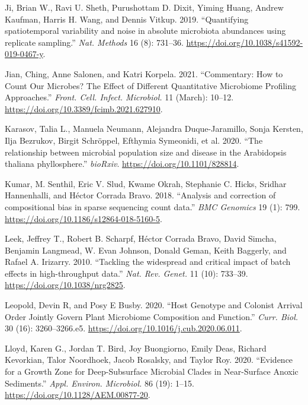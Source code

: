 \documentclass[
]{article}
\newlength{\cslhangindent}
\newlength{\cslentryspacingunit} %
\newenvironment{CSLReferences}[2] %
 {%
  \setlength{\parindent}{0pt}
  \ifodd #1
  \let\oldpar\par
  \def\par{\hangindent=\cslhangindent\oldpar}
  \fi
  \setlength{\parskip}{#2\cslentryspacingunit}
 }%
 {}
\begin{document}
\begin{CSLReferences}{1}{0}
\leavevmode{}%
Ji, Brian W., Ravi U. Sheth, Purushottam D. Dixit, Yiming Huang, Andrew Kaufman, Harris H. Wang, and Dennis Vitkup. 2019. {``{Quantifying spatiotemporal variability and noise in absolute microbiota abundances using replicate sampling}.''} \emph{Nat. Methods} 16 (8): 731--36. \url{https://doi.org/10.1038/s41592-019-0467-y}.

\leavevmode{}%
Jian, Ching, Anne Salonen, and Katri Korpela. 2021. {``{Commentary: How to Count Our Microbes? The Effect of Different Quantitative Microbiome Profiling Approaches}.''} \emph{Front. Cell. Infect. Microbiol.} 11 (March): 10--12. \url{https://doi.org/10.3389/fcimb.2021.627910}.

\leavevmode{}%
Karasov, Talia L., Manuela Neumann, Alejandra Duque-Jaramillo, Sonja Kersten, Ilja Bezrukov, Birgit Schröppel, Efthymia Symeonidi, et al. 2020. {``{The relationship between microbial population size and disease in the Arabidopsis thaliana phyllosphere}.''} \emph{bioRxiv}. \url{https://doi.org/10.1101/828814}.

\leavevmode{}%
Kumar, M. Senthil, Eric V. Slud, Kwame Okrah, Stephanie C. Hicks, Sridhar Hannenhalli, and Héctor Corrada Bravo. 2018. {``{Analysis and correction of compositional bias in sparse sequencing count data}.''} \emph{BMC Genomics} 19 (1): 799. \url{https://doi.org/10.1186/s12864-018-5160-5}.

\leavevmode{}%
Leek, Jeffrey T., Robert B. Scharpf, Héctor Corrada Bravo, David Simcha, Benjamin Langmead, W. Evan Johnson, Donald Geman, Keith Baggerly, and Rafael A. Irizarry. 2010. {``{Tackling the widespread and critical impact of batch effects in high-throughput data}.''} \emph{Nat. Rev. Genet.} 11 (10): 733--39. \url{https://doi.org/10.1038/nrg2825}.

\leavevmode{}%
Leopold, Devin R, and Posy E Busby. 2020. {``{Host Genotype and Colonist Arrival Order Jointly Govern Plant Microbiome Composition and Function}.''} \emph{Curr. Biol.} 30 (16): 3260--3266.e5. \url{https://doi.org/10.1016/j.cub.2020.06.011}.

\leavevmode{}%
Lloyd, Karen G., Jordan T. Bird, Joy Buongiorno, Emily Deas, Richard Kevorkian, Talor Noordhoek, Jacob Rosalsky, and Taylor Roy. 2020. {``{Evidence for a Growth Zone for Deep-Subsurface Microbial Clades in Near-Surface Anoxic Sediments}.''} \emph{Appl. Environ. Microbiol.} 86 (19): 1--15. \url{https://doi.org/10.1128/AEM.00877-20}.


\end{CSLReferences}
\end{document}

